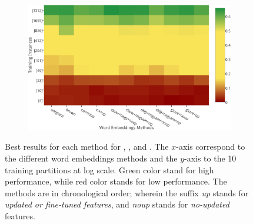 \begin{figure}
\begin{subfigure}{7cm}
	\subcaption{\ner \fscore}	
	\label{ner}
\end{subfigure}
\begin{subfigure}{7cm}
	\centering
    \includegraphics[scale=0.4]{plots/map-mwe-color-invert}
	\subcaption{\mwe \fscore}		
	\label{mwe}
\end{subfigure}
\caption{Best results for each method for \pos, \chunking, \ner and
  \mwe. The $x$-axis correspond to the different word embeddings methods
  and the $y$-axis to the 10 training partitions at log scale. Green
  color stand for high performance, while red color stands for low
  performance. The methods are in chronological order; wherein the
  suffix \textit{up} stands for \textit{updated or fine-tuned features},
  and \textit{noup} stands for \textit{no-updated} features.}
\label{fig:heatmaps}
\end{figure}


